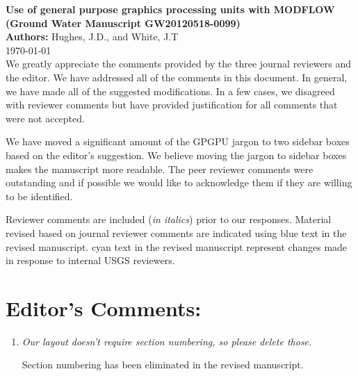 \documentclass[12pt]{article} %
\begin{document}
\noindent
\textbf{Use of general purpose graphics processing units with MODFLOW \\ (Ground Water Manuscript GW20120518-0099) }\\

\noindent
\textbf{Authors:} Hughes, J.D., and White, J.T \\

\today \\

\noindent
We greatly appreciate the comments provided by the three journal reviewers and the editor. We have addressed all of the comments in this document. In general, we have made all of the suggested modifications. In a few cases, we disagreed with reviewer comments but have provided justification for all comments that were not accepted.

We have moved a significant amount of the GPGPU jargon to two sidebar boxes based on the editor's suggestion. We believe moving the jargon to sidebar boxes makes the manuscript more readable. The peer reviewer comments were outstanding and if possible we would like to acknowledge them if they are willing to be identified.

Reviewer comments are included (\textit{in italics}) prior to our responses. Material revised based on journal reviewer comments are indicated using \color{blue} blue \color{black}text in the revised manuscript. \color{cyan} cyan \color{black}text in the revised manuscript represent changes made in response to internal USGS reviewers. 

\section*{Editor's Comments:}
\begin{enumerate}
\item \textit{Our layout doesn't require section numbering, so please delete those.}

Section numbering has been eliminated in the revised manuscript.

\end{enumerate}
\end{document}
